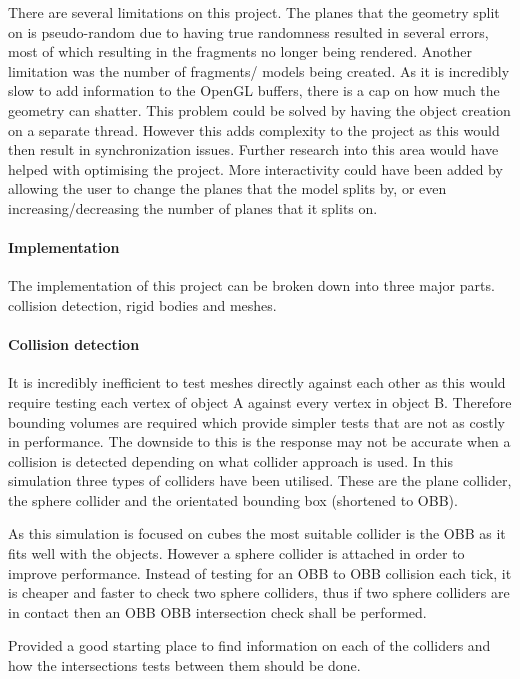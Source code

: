 \documentclass[conference,backref=page]{acmsiggraph}
\begin{document}
There are several limitations on this project. The planes that the geometry split on is pseudo-random due to having true randomness resulted in several errors, most of which resulting in the fragments no longer being rendered. Another limitation was the number of fragments/ models being created. As it is incredibly slow to add information to the OpenGL buffers, there is a cap on how much the geometry can shatter. This problem could be solved by having the object creation on a separate thread. However this adds complexity to the project as this would then result in synchronization issues. Further research into this area would have helped with optimising the project. More interactivity could have been added by allowing the user to change the planes that the model splits by, or even increasing/decreasing the number of planes that it splits on. 

\paragraph{Implementation} \hfill

The implementation of this project can be broken down into three major parts. collision detection, rigid bodies and meshes.

\paragraph {Collision detection} \hfill

It is incredibly inefficient to test meshes directly against each other as this would require testing each vertex of object A against every vertex in object B. Therefore bounding volumes are required which provide simpler tests that are not as costly in performance. The downside to this is the response may not be accurate when a collision is detected depending on what collider approach is used. In this simulation three types of colliders have been utilised. These are the plane collider, the sphere collider and the orientated bounding box (shortened to OBB). 

As this simulation is focused on cubes the most suitable collider is the OBB as it fits well with the objects. However a sphere collider is attached in order to improve performance. Instead of testing for an OBB to OBB collision each tick, it is cheaper and faster to check two sphere colliders, thus if two sphere colliders are in contact then an OBB OBB intersection check shall be performed. 


\cite{BoundingVolume} Provided a good starting place to find information on each of the colliders and how the intersections tests between them should be done.
\end{document}

